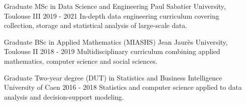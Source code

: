 


\begin{cventries}


\cventry
{Graduate} %
{MSc in Data Science and Engineering} %
{Paul Sabatier University, Toulouse III} %
{2019 - 2021} %
{In-depth data engineering curriculum covering collection, storage and statistical analysis of large-scale data.} %
\vspace{1em}


\cventry
{Graduate} %
{BSc in Applied Mathematics (MIASHS)} %
{Jean Jaurès University, Toulouse II} %
{2018 - 2019} %
{Multidisciplinary curriculum combining applied mathematics, computer science and social sciences.} %
\vspace{1em}


\cventry
{Graduate} %
{Two-year degree (DUT) in Statistics and Business Intelligence} %
{University of Caen} %
{2016 - 2018} %
{Statistics and computer science applied to data analysis and decision-support modeling.} %


\end{cventries}
